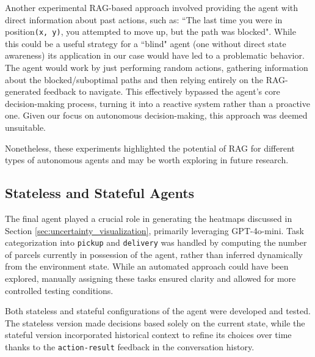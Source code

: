 Another experimental RAG-based approach involved providing the agent with direct
information about past actions, such as: ``The last time you were in position\texttt{(x,
y)}, you attempted to move up, but the path was blocked". While this could be a
useful strategy for a ``blind" agent (one without direct state awareness) its application
in our case would have led to a problematic behavior. The agent would work by
just performing random actions, gathering information about the blocked/suboptimal
paths and then relying entirely on the RAG-generated feedback to navigate. This
effectively bypassed the agent's core decision-making process, turning it into a
reactive system rather than a proactive one. Given our focus on autonomous
decision-making, this approach was deemed unsuitable.

Nonetheless, these experiments highlighted the potential of RAG for different
types of autonomous agents and may be worth exploring in future research.

\subsection{Stateless and Stateful Agents}

The final agent played a crucial role in generating the heatmaps discussed in Section
\ref{sec:uncertainty_visualization}, primarily leveraging GPT-4o-mini. Task categorization
into \texttt{pickup} and \texttt{delivery} was handled by computing the number of
parcels currently in possession of the agent, rather than inferred dynamically
from the environment state. While an automated approach could have been explored,
manually assigning these tasks ensured clarity and allowed for more controlled
testing conditions.

Both stateless and stateful configurations of the agent were developed and
tested. The stateless version made decisions based solely on the current state,
while the stateful version incorporated historical context to refine its choices
over time thanks to the \texttt{action-result} feedback in the conversation history.

